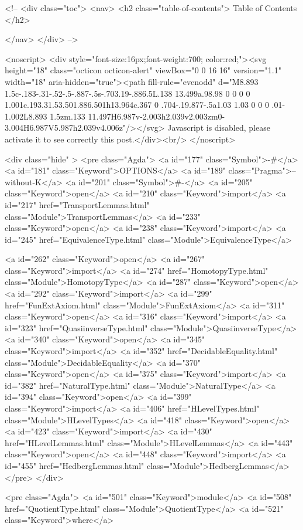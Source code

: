   <!-- 
  <div class="toc">
    <nav>
    <h2 class="table-of-contents"> Table of Contents </h2>
      

    </nav>
  </div>
   -->

  <noscript>
  <div style="font-size:16px;font-weight:700; color:red;"><svg height="18" class="octicon octicon-alert" viewBox="0 0 16 16" version="1.1" width="18" aria-hidden="true"><path fill-rule="evenodd" d="M8.893 1.5c-.183-.31-.52-.5-.887-.5s-.703.19-.886.5L.138 13.499a.98.98 0 0 0 0 1.001c.193.31.53.501.886.501h13.964c.367 0 .704-.19.877-.5a1.03 1.03 0 0 0 .01-1.002L8.893 1.5zm.133 11.497H6.987v-2.003h2.039v2.003zm0-3.004H6.987V5.987h2.039v4.006z"/></svg> Javascript is disabled, please activate it to see correctly this post.</div><br/>
  </noscript>

  <div class="hide" >
<pre class="Agda">
<a id="177" class="Symbol">{-#</a> <a id="181" class="Keyword">OPTIONS</a> <a id="189" class="Pragma">--without-K</a> <a id="201" class="Symbol">#-}</a>
<a id="205" class="Keyword">open</a> <a id="210" class="Keyword">import</a> <a id="217" href="TransportLemmas.html" class="Module">TransportLemmas</a>
<a id="233" class="Keyword">open</a> <a id="238" class="Keyword">import</a> <a id="245" href="EquivalenceType.html" class="Module">EquivalenceType</a>

<a id="262" class="Keyword">open</a> <a id="267" class="Keyword">import</a> <a id="274" href="HomotopyType.html" class="Module">HomotopyType</a>
<a id="287" class="Keyword">open</a> <a id="292" class="Keyword">import</a> <a id="299" href="FunExtAxiom.html" class="Module">FunExtAxiom</a>
<a id="311" class="Keyword">open</a> <a id="316" class="Keyword">import</a> <a id="323" href="QuasiinverseType.html" class="Module">QuasiinverseType</a>
<a id="340" class="Keyword">open</a> <a id="345" class="Keyword">import</a> <a id="352" href="DecidableEquality.html" class="Module">DecidableEquality</a>
<a id="370" class="Keyword">open</a> <a id="375" class="Keyword">import</a> <a id="382" href="NaturalType.html" class="Module">NaturalType</a>
<a id="394" class="Keyword">open</a> <a id="399" class="Keyword">import</a> <a id="406" href="HLevelTypes.html" class="Module">HLevelTypes</a>
<a id="418" class="Keyword">open</a> <a id="423" class="Keyword">import</a> <a id="430" href="HLevelLemmas.html" class="Module">HLevelLemmas</a>
<a id="443" class="Keyword">open</a> <a id="448" class="Keyword">import</a> <a id="455" href="HedbergLemmas.html" class="Module">HedbergLemmas</a>
</pre>
</div>

<pre class="Agda">
<a id="501" class="Keyword">module</a> <a id="508" href="QuotientType.html" class="Module">QuotientType</a> <a id="521" class="Keyword">where</a>


